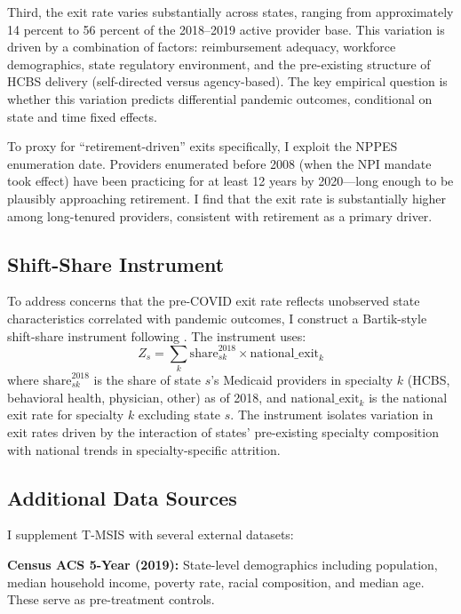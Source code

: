 \documentclass[12pt]{article}
\begin{document}
Third, the exit rate varies substantially across states, ranging from approximately 14 percent to 56 percent of the 2018--2019 active provider base. This variation is driven by a combination of factors: reimbursement adequacy, workforce demographics, state regulatory environment, and the pre-existing structure of HCBS delivery (self-directed versus agency-based). The key empirical question is whether this variation predicts differential pandemic outcomes, conditional on state and time fixed effects.

To proxy for ``retirement-driven'' exits specifically, I exploit the NPPES enumeration date. Providers enumerated before 2008 (when the NPI mandate took effect) have been practicing for at least 12 years by 2020---long enough to be plausibly approaching retirement. I find that the exit rate is substantially higher among long-tenured providers, consistent with retirement as a primary driver.

\subsection{Shift-Share Instrument}

To address concerns that the pre-COVID exit rate reflects unobserved state characteristics correlated with pandemic outcomes, I construct a Bartik-style shift-share instrument following \citet{goldsmithpinkham2020}. The instrument uses:
\begin{equation}
Z_s = \sum_k \text{share}_{sk}^{2018} \times \text{national\_exit}_k
\end{equation}
where $\text{share}_{sk}^{2018}$ is the share of state $s$'s Medicaid providers in specialty $k$ (HCBS, behavioral health, physician, other) as of 2018, and $\text{national\_exit}_k$ is the national exit rate for specialty $k$ excluding state $s$. The instrument isolates variation in exit rates driven by the interaction of states' pre-existing specialty composition with national trends in specialty-specific attrition.

\subsection{Additional Data Sources}

I supplement T-MSIS with several external datasets:

\textbf{Census ACS 5-Year (2019):} State-level demographics including population, median household income, poverty rate, racial composition, and median age. These serve as pre-treatment controls.
\end{document}
